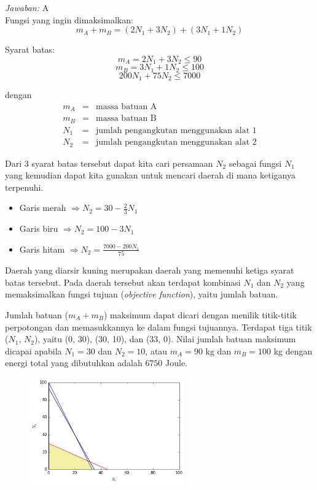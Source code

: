 \documentclass[11pt,fleqn]{exam}
\begin{document}
\begin{questions}
\textit{Jawaban: } A\\

Fungsi yang ingin dimaksimalkan:
$$m_A + m_B = (2N_1 + 3N_2) + (3N_1 + 1 N_2)$$

Syarat batas:
$$m_A = 2N_1 + 3N_2 \leq 90$$
$$m_B = 3N_1 + 1N_2 \leq 100$$
$$200 N_1 + 75 N_2 \leq 7000$$

dengan
\begin{eqnarray*}
m_A &=& \text{massa batuan A}\\
m_B &=& \text{massa batuan B}\\
N_1 &=& \text{jumlah pengangkutan menggunakan alat 1}\\
N_2 &=& \text{jumlah pengangkutan menggunakan alat 2}
\end{eqnarray*}

Dari 3 syarat batas tersebut dapat kita cari persamaan $N_2$ sebagai fungsi $N_1$ yang kemudian dapat kita gunakan untuk mencari daerah di mana ketiganya terpenuhi. 

\begin{itemize}
\item Garis merah $\Rightarrow N_2 = 30 - \frac{2}{3} N_1$
\item Garis biru $\Rightarrow N_2 = 100 - 3 N_1$
\item Garis hitam $\Rightarrow N_2 = \frac{7000 - 200 N_1}{75}$
\end{itemize}

Daerah yang diarsir kuning merupakan daerah yang memenuhi ketiga syarat batas tersebut. Pada daerah tersebut akan terdapat kombinasi $N_1$ dan $N_2$ yang memaksimalkan fungsi tujuan (\textit{objective function}), yaitu jumlah batuan. 

Jumlah batuan ($m_A + m_B$) maksimum dapat dicari dengan menilik titik-titik perpotongan dan memasukkannya ke dalam fungsi tujuannya. Terdapat tiga titik ($N_1$, $N_2$), yaitu (0, 30), (30, 10), dan (33, 0). Nilai jumlah batuan maksimum dicapai apabila $N_1 = 30$ dan $N_2 = 10$, atau $m_A = 90$ kg dan $m_B = 100$ kg dengan energi total yang dibutuhkan adalah $6750$ Joule.

\begin{figure}[!ht]
\centering
\includegraphics[width=0.6\textwidth]{osk_05.png}
\end{figure}


\end{questions}
\end{document}
